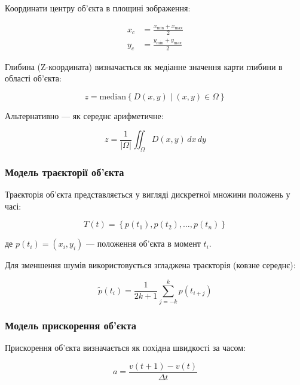 \documentclass[14pt, a4paper]{extarticle}
\numberwithin{equation}{section}
\begin{document}
Координати центру об'єкта в площині зображення:

\begin{align}
x_c &= \frac{x_{\min} + x_{\max}}{2} \tag{36} \\
y_c &= \frac{y_{\min} + y_{\max}}{2} \tag{37}
\end{align}

Глибина (Z-координата) визначається як медіанне значення карти глибини в області об'єкта:

\begin{equation}
\boxed{z = \text{median}\left\{ D(x,y) \mid (x,y) \in \Omega \right\}} \tag{38}
\end{equation}

Альтернативно — як середнє арифметичне:

\begin{equation}
z = \frac{1}{|\Omega|} \iint_{\Omega} D(x,y) \, dx\,dy \tag{39}
\end{equation}

\subsubsection{Модель траєкторії об'єкта}

Траєкторія об'єкта представляється у вигляді дискретної множини положень у часі:

\begin{equation}
\boxed{T(t) = \left\{ p(t_1), p(t_2), \ldots, p(t_n) \right\}} \tag{40}
\end{equation}

де $p(t_i) = (x_i, y_i)$ — положення об'єкта в момент $t_i$.

Для зменшення шумів використовується згладжена траєкторія (ковзне середнє):

\begin{equation}
\tilde{p}(t_i) = \frac{1}{2k+1} \sum_{j=-k}^{k} p(t_{i+j}) \tag{41}
\end{equation}

\subsubsection{Модель прискорення об'єкта}

Прискорення об'єкта визначається як похідна швидкості за часом:

\begin{equation}
\boxed{a = \frac{v(t+1) - v(t)}{\Delta t}} \tag{42}
\end{equation}
\end{document}
